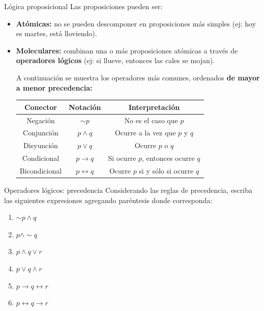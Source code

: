 \documentclass{beamer}
\begin{document}
\begin{frame}{Lógica proposicional}
  Las proposiciones pueden ser:
  \begin{itemize}[<+->]
    \item \textbf{Atómicas:} no se pueden descomponer en proposiciones más
          simples (ej: hoy es martes, está lloviendo).
    \item \textbf{Moleculares:} combinan una o más proposiciones atómicas a
          través de \textbf{operadores lógicos} (ej: si llueve, entonces las
          cales se mojan).

          A continuación se muestra los operadores más comunes, ordenados
          \textbf{de mayor a menor precedencia:}
          \begin{table}[H]
            \begin{tabular}{|c|c|c|}
              \hline
              \textbf{Conector}      & \textbf{Notación}              & \textbf{Interpretación}                     \\ \hline
              Negación      & $\sim p$              & No es el caso que $p$              \\ \hline
              Conjunción    & $p \land q$           & Ocurre a la vez que $p$ y $q$      \\ \hline
              Disyunción    & $p \vee q$            & Ocurre $p$ o $q$                   \\ \hline
              Condicional   & $p \rightarrow q$     & Si ocurre $p$, entonces ocurre $q$               \\ \hline
              Bicondicional & $p \leftrightarrow q$ & Ocurre $p$ si y sólo si ocurre $q$ \\ \hline
            \end{tabular}
          \end{table}
  \end{itemize}
\end{frame}


\begin{frame}{Operadores lógicos: precedencia}
  Considerando las reglas de precedencia, escriba las siguientes expresiones
  agregando paréntesis donde corresponda:
  \begin{enumerate}
    \item $\sim p \land q$
    \item $p \land \sim q$
    \item $p \land q \vee r$
    \item $p \vee q \land r$
    \item $p \rightarrow q \leftrightarrow r$
    \item $p \leftrightarrow q \rightarrow r$
  \end{enumerate}
\end{frame}
\end{document}
